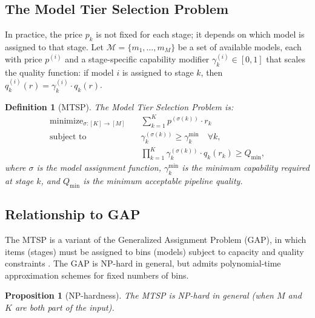 \documentclass[11pt, a4paper, logo, copyright]{googledeepmind}
\DeclareMathOperator*{\minimize}{minimize}
\newtheorem{definition}{Definition}[section]
\newtheorem{proposition}{Proposition}[section]
\begin{document}
\subsection{The Model Tier Selection Problem}

In practice, the price $p_k$ is not fixed for each stage; it depends on which model is assigned to that stage. Let $\mathcal{M} = \{m_1, \ldots, m_M\}$ be a set of available models, each with price $p^{(i)}$ and a stage-specific capability modifier $\gamma_k^{(i)} \in [0,1]$ that scales the quality function: if model $i$ is assigned to stage $k$, then $q_k^{(i)}(r) = \gamma_k^{(i)} \cdot q_k(r)$.

\begin{definition}[MTSP]\label{def:mtsp}
The \emph{Model Tier Selection Problem} is:
\begin{equation}\label{eq:mtsp}
\begin{aligned}
    \minimize_{\sigma: [K] \to [M]} \quad & \sum_{k=1}^{K} p^{(\sigma(k))} \cdot r_k \\
    \text{subject to} \quad & \gamma_k^{(\sigma(k))} \geq \gamma_k^{\min} \quad \forall k, \\
    & \prod_{k=1}^{K} \gamma_k^{(\sigma(k))} \cdot q_k(r_k) \geq Q_{\min},
\end{aligned}
\end{equation}
where $\sigma$ is the model assignment function, $\gamma_k^{\min}$ is the minimum capability required at stage $k$, and $Q_{\min}$ is the minimum acceptable pipeline quality.
\end{definition}

\subsection{Relationship to GAP}

The MTSP is a variant of the Generalized Assignment Problem (GAP), in which items (stages) must be assigned to bins (models) subject to capacity and quality constraints \citep{chekuri2005}. The GAP is NP-hard in general, but admits polynomial-time approximation schemes for fixed numbers of bins.

\begin{proposition}[NP-hardness]\label{prop:np-hard}
The MTSP is NP-hard in general (when $M$ and $K$ are both part of the input).
\end{proposition}
\end{document}
